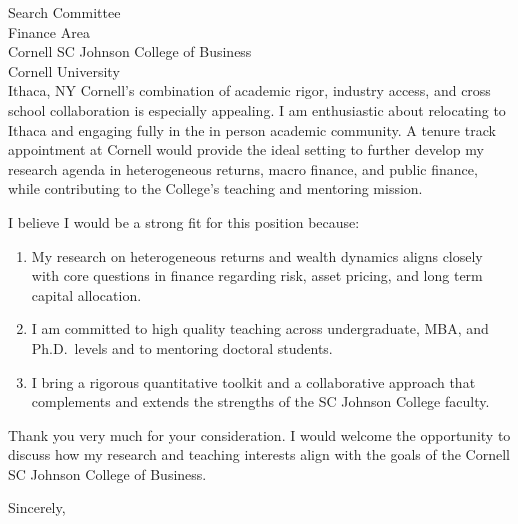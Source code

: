 \documentclass[11pt,letterpaper]{letter}
\begin{document}
\begin{letter}{
Search Committee \\
Finance Area \\
Cornell SC Johnson College of Business \\
Cornell University \\
Ithaca, NY
}
Cornell’s combination of academic rigor, industry access, and cross school collaboration is especially appealing. I am enthusiastic about relocating to Ithaca and engaging fully in the in person academic community. A tenure track appointment at Cornell would provide the ideal setting to further develop my research agenda in heterogeneous returns, macro finance, and public finance, while contributing to the College’s teaching and mentoring mission.

I believe I would be a strong fit for this position because:
\begin{enumerate}
    \item My research on heterogeneous returns and wealth dynamics aligns closely with core questions in finance regarding risk, asset pricing, and long term capital allocation.
    \item I am committed to high quality teaching across undergraduate, MBA, and Ph.D.\ levels and to mentoring doctoral students.
    \item I bring a rigorous quantitative toolkit and a collaborative approach that complements and extends the strengths of the SC Johnson College faculty.
\end{enumerate}

Thank you very much for your consideration. I would welcome the opportunity to discuss how my research and teaching interests align with the goals of the Cornell SC Johnson College of Business.

\closing{Sincerely,}

\end{letter}
\end{document}
